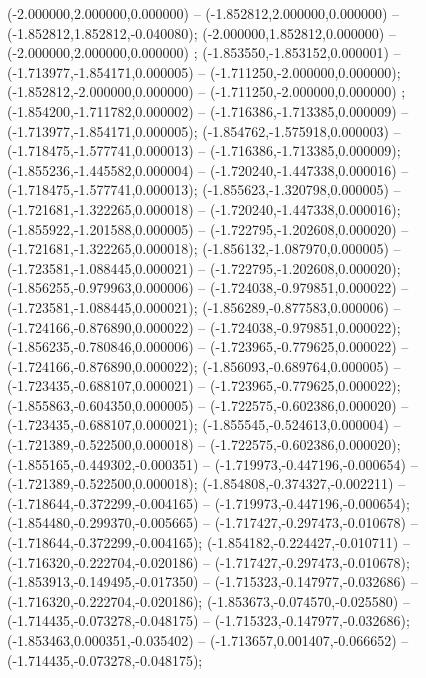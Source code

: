  (-2.000000,2.000000,0.000000) -- (-1.852812,2.000000,0.000000) -- (-1.852812,1.852812,-0.040080);
 (-2.000000,1.852812,0.000000) -- (-2.000000,2.000000,0.000000) ;
 (-1.853550,-1.853152,0.000001) -- (-1.713977,-1.854171,0.000005) -- (-1.711250,-2.000000,0.000000);
 (-1.852812,-2.000000,0.000000) -- (-1.711250,-2.000000,0.000000) ;
 (-1.854200,-1.711782,0.000002) -- (-1.716386,-1.713385,0.000009) -- (-1.713977,-1.854171,0.000005);
 (-1.854762,-1.575918,0.000003) -- (-1.718475,-1.577741,0.000013) -- (-1.716386,-1.713385,0.000009);
 (-1.855236,-1.445582,0.000004) -- (-1.720240,-1.447338,0.000016) -- (-1.718475,-1.577741,0.000013);
 (-1.855623,-1.320798,0.000005) -- (-1.721681,-1.322265,0.000018) -- (-1.720240,-1.447338,0.000016);
 (-1.855922,-1.201588,0.000005) -- (-1.722795,-1.202608,0.000020) -- (-1.721681,-1.322265,0.000018);
 (-1.856132,-1.087970,0.000005) -- (-1.723581,-1.088445,0.000021) -- (-1.722795,-1.202608,0.000020);
 (-1.856255,-0.979963,0.000006) -- (-1.724038,-0.979851,0.000022) -- (-1.723581,-1.088445,0.000021);
 (-1.856289,-0.877583,0.000006) -- (-1.724166,-0.876890,0.000022) -- (-1.724038,-0.979851,0.000022);
 (-1.856235,-0.780846,0.000006) -- (-1.723965,-0.779625,0.000022) -- (-1.724166,-0.876890,0.000022);
 (-1.856093,-0.689764,0.000005) -- (-1.723435,-0.688107,0.000021) -- (-1.723965,-0.779625,0.000022);
 (-1.855863,-0.604350,0.000005) -- (-1.722575,-0.602386,0.000020) -- (-1.723435,-0.688107,0.000021);
 (-1.855545,-0.524613,0.000004) -- (-1.721389,-0.522500,0.000018) -- (-1.722575,-0.602386,0.000020);
 (-1.855165,-0.449302,-0.000351) -- (-1.719973,-0.447196,-0.000654) -- (-1.721389,-0.522500,0.000018);
 (-1.854808,-0.374327,-0.002211) -- (-1.718644,-0.372299,-0.004165) -- (-1.719973,-0.447196,-0.000654);
 (-1.854480,-0.299370,-0.005665) -- (-1.717427,-0.297473,-0.010678) -- (-1.718644,-0.372299,-0.004165);
 (-1.854182,-0.224427,-0.010711) -- (-1.716320,-0.222704,-0.020186) -- (-1.717427,-0.297473,-0.010678);
 (-1.853913,-0.149495,-0.017350) -- (-1.715323,-0.147977,-0.032686) -- (-1.716320,-0.222704,-0.020186);
 (-1.853673,-0.074570,-0.025580) -- (-1.714435,-0.073278,-0.048175) -- (-1.715323,-0.147977,-0.032686);
 (-1.853463,0.000351,-0.035402) -- (-1.713657,0.001407,-0.066652) -- (-1.714435,-0.073278,-0.048175);
